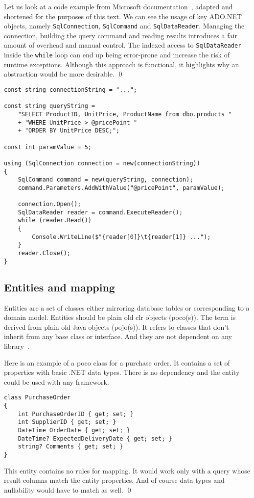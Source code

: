 \begin{example}
\small
Let us look at a code example from Microsoft documentation~\cite{ADONET}, adapted and shortened for the purposes of this text.
We can see the usage of key ADO.NET objects, namely \texttt{SqlConnection}, \texttt{SqlCommand} and \texttt{SqlDataReader}. Managing the connection, building the query command and reading results introduces a fair amount of overhead and manual control. The indexed access to \texttt{SqlDataReader} inside the \texttt{while} loop can end up being error-prone and increase the risk of runtime exceptions. Although this approach is functional, it highlights why an abstraction would be more desirable.
\qed

\begin{lstlisting}[language=CSharp]
const string connectionString = "...";

const string queryString =
    "SELECT ProductID, UnitPrice, ProductName from dbo.products "
    + "WHERE UnitPrice > @pricePoint "
    + "ORDER BY UnitPrice DESC;";

const int paramValue = 5;

using (SqlConnection connection = new(connectionString))
{
    SqlCommand command = new(queryString, connection);
    command.Parameters.AddWithValue("@pricePoint", paramValue);

    connection.Open();
    SqlDataReader reader = command.ExecuteReader();
    while (reader.Read())
    {
        Console.WriteLine($"{reader[0]}\t{reader[1]} ...");
    }
    reader.Close();
}
\end{lstlisting}
\end{example}

\subsection{Entities and mapping}
Entities are a set of classes either mirroring database tables or corresponding to a domain model. Entities should be plain old \acrshort{clr} objects (\acrshort{poco}(s)). The term is derived from plain old Java objects (\acrshort{pojo}(s)). It refers to classes that don't inherit from any base class or interface. And they are not dependent on any library~\cite{Fowler2003POJO}.

\begin{example}
\small
Here is an example of a \acrshort{poco} class for a purchase order. It contains a set of properties with basic .NET data types. There is no dependency and the entity could be used with any framework.
\begin{lstlisting}[language=CSharp]
class PurchaseOrder
{
    int PurchaseOrderID { get; set; }
    int SupplierID { get; set; }
    DateTime OrderDate { get; set; }
    DateTime? ExpectedDeliveryDate { get; set; }
    string? Comments { get; set; }
}
\end{lstlisting}
This entity contains no rules for mapping. It would work only with a query whose result columns match the entity properties. And of course data types and nullability would have to match as well.
\qed
\end{example}

